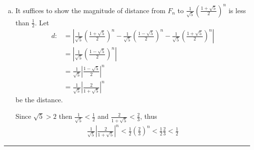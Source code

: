 \documentclass[12pt, letterpaper]{scrartcl}
\begin{document}
\begin{enumerate}[(a)]
    \item It suffices to show the magnitude of distance from $F_n$ to $\frac{1}{\sqrt{5}}\left(\frac{1+\sqrt{5}}{2}\right)^n$ is less than $\frac{1}{2}$. Let
    \begin{align*}
        d:&=\left|
        \frac{1}{\sqrt{5}}\left(\frac{1+\sqrt{5}}{2}\right)^n-\frac{1}{\sqrt{5}}\left(\frac{1-\sqrt{5}}{2}\right)^n - \frac{1}{\sqrt{5}}\left(\frac{1+\sqrt{5}}{2}\right)^n
        \right|\\
        &=
        \left|
        \frac{1}{\sqrt{5}}\left(\frac{1-\sqrt{5}}{2}\right)^n
        \right| \\
        &=
        \frac{1}{\sqrt{5}}
        \left|
        \frac{1-\sqrt{5}}{2}
        \right|^n\\
        &=
        \frac{1}{\sqrt{5}}
        \left|
        \frac{2}{1+\sqrt{5}}
        \right|^n
    \end{align*}
    be the distance.
    
    Since $\sqrt{5}>2$ then $\frac{1}{\sqrt{5}}<\frac{1}{2}$ and $\frac{2}{1+\sqrt{5}}<\frac{2}{3}$, thus
    \begin{align*}
        \frac{1}{\sqrt{5}}
        \left|
        \frac{2}{1+\sqrt{5}}
        \right|^n < \frac{1}{2}(\frac{2}{3})^n <\frac{1}{2}\frac{2}{3} <\frac{1}{2}
    \end{align*}
    
\end{enumerate}
\vskip1mm\hrule
\end{document}
